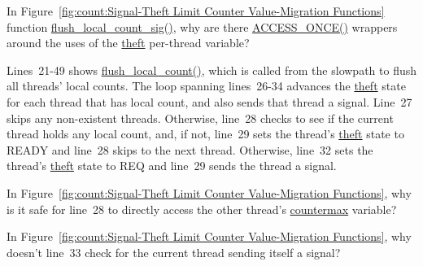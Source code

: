 \QuickQuiz{}
	In Figure~\ref{fig:count:Signal-Theft Limit Counter Value-Migration Functions}
	function \url{flush_local_count_sig()}, why are there
	\url{ACCESS_ONCE()} wrappers around the uses of the
	\url{theft} per-thread variable?
 \QuickQuizEnd

Lines~21-49 shows \url{flush_local_count()}, which is called from the
slowpath to flush all threads' local counts.
The loop spanning lines~26-34 advances the \url{theft} state for each
thread that has local count, and also sends that thread a signal.
Line~27 skips any non-existent threads.
Otherwise, line~28 checks to see if the current thread holds any local
count, and, if not, line~29 sets the thread's \url{theft} state to READY
and line~28 skips to the next thread.
Otherwise, line~32 sets the thread's \url{theft} state to REQ and
line~29 sends the thread a signal.

\QuickQuiz{}
	In Figure~\ref{fig:count:Signal-Theft Limit Counter Value-Migration Functions},
	why is it safe for line~28 to directly access the other thread's
	\url{countermax} variable?
 \QuickQuizEnd

\QuickQuiz{}
	In Figure~\ref{fig:count:Signal-Theft Limit Counter Value-Migration Functions},
	why doesn't line~33 check for the current thread sending itself
	a signal?
 \QuickQuizEnd

